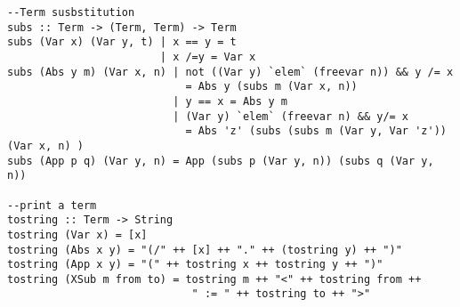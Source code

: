 \begin{verbatim}
--Term susbstitution
subs :: Term -> (Term, Term) -> Term
subs (Var x) (Var y, t) | x == y = t
                        | x /=y = Var x
subs (Abs y m) (Var x, n) | not ((Var y) `elem` (freevar n)) && y /= x 
                            = Abs y (subs m (Var x, n))
                          | y == x = Abs y m
                          | (Var y) `elem` (freevar n) && y/= x 
                            = Abs 'z' (subs (subs m (Var y, Var 'z')) (Var x, n) )
subs (App p q) (Var y, n) = App (subs p (Var y, n)) (subs q (Var y, n))

--print a term
tostring :: Term -> String
tostring (Var x) = [x]
tostring (Abs x y) = "(/" ++ [x] ++ "." ++ (tostring y) ++ ")"
tostring (App x y) = "(" ++ tostring x ++ tostring y ++ ")"
tostring (XSub m from to) = tostring m ++ "<" ++ tostring from ++ 
                             " := " ++ tostring to ++ ">"

\end{verbatim}